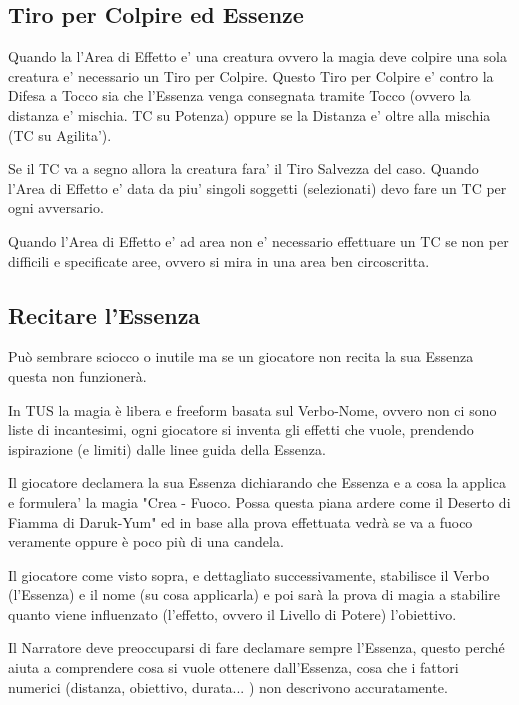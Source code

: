 \documentclass[a4paper,11pt,twoside,openany]{book}
\begin{document}
\subsection{Tiro per Colpire ed Essenze}

Quando la l'Area di Effetto e' una creatura ovvero la magia deve colpire una sola creatura e' necessario un Tiro per Colpire.
Questo Tiro per Colpire e' contro la Difesa a Tocco sia che l'Essenza venga consegnata tramite Tocco (ovvero la distanza e' mischia. TC su Potenza) oppure se la Distanza e' oltre alla mischia (TC su Agilita').

Se il TC va a segno allora la creatura fara' il Tiro Salvezza del caso.
Quando l'Area di Effetto e' data da piu' singoli soggetti (selezionati) devo fare un TC per ogni avversario.

Quando l'Area di Effetto e' ad area non e' necessario effettuare un TC se non per difficili e specificate aree, ovvero si mira in una area ben circoscritta.


\subsection{Recitare l'Essenza}

\label{recitare-lessenza}

Può sembrare sciocco o inutile ma se un giocatore non recita la sua Essenza questa non funzionerà.

In TUS la magia è libera e freeform basata sul Verbo-Nome, ovvero non ci sono liste di incantesimi, ogni giocatore si inventa gli effetti che vuole, prendendo ispirazione (e limiti) dalle linee guida della Essenza.

Il giocatore declamera la sua Essenza dichiarando che Essenza e a cosa la applica e formulera' la magia "Crea - Fuoco. Possa questa piana ardere come il Deserto di Fiamma di Daruk-Yum" ed in base alla prova effettuata vedrà se va a fuoco veramente oppure è poco più di una candela.

Il giocatore come visto sopra, e dettagliato successivamente, stabilisce il Verbo (l'Essenza) e il nome (su cosa applicarla) e poi sarà la prova di magia a stabilire quanto viene influenzato (l'effetto, ovvero il Livello di Potere) l'obiettivo.

Il Narratore deve preoccuparsi di fare declamare sempre l'Essenza, questo perché aiuta a comprendere cosa si vuole ottenere dall'Essenza, cosa che i fattori numerici (distanza, obiettivo, durata... ) non descrivono accuratamente.
\end{document}
